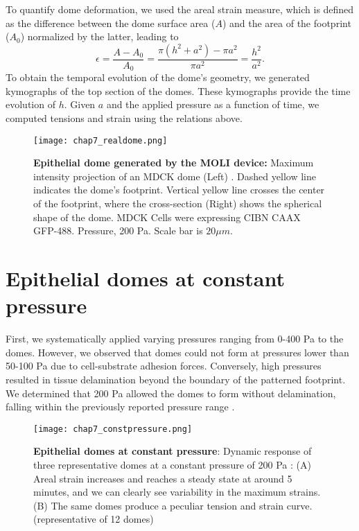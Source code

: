To quantify dome deformation, we used the areal strain measure, which is defined as the difference between the dome surface area ($A$) and the area of the footprint ($A_{0}$) normalized by the latter, leading to
\begin{equation}
	\label{eqn:arealstrain}
	\epsilon = \frac{A - A_{0}}{A_{0}} = \frac{\pi(h^2 + a^2) - \pi a^2}{\pi a^2} = \frac{h^2}{a^2} .
\end{equation}
To obtain the temporal evolution of the dome’s geometry, we generated kymographs of the top section of the domes. These kymographs provide the time evolution of $h$. Given $a$ and the applied pressure as a function of time, we computed tensions and strain using the relations above.

\begin{figure}
	\centering
	\texttt{[image: chap7\_realdome.png]}
	\caption{\textbf{Epithelial dome generated by the MOLI device:} Maximum intensity projection of an MDCK dome (Left) . Dashed yellow line indicates the dome's footprint. Vertical yellow line crosses the center of the footprint, where the cross-section   (Right) shows the spherical shape of the dome. MDCK Cells were expressing CIBN CAAX GFP-488. Pressure, 200 Pa. Scale bar is $20 \mu m$.
	} \label{fig_7_1}
\end{figure}

\hypertarget{epithelial-domes-at-constant-pressure}{%
	\section{Epithelial domes at constant
		pressure}\label{epithelial-domes-at-constant-pressure}}

First, we systematically applied varying pressures ranging from 0-400 \unit{\pascal} to the domes. However, we observed that domes could not form at pressures lower than 50-100 \unit{\pascal} due to cell-substrate adhesion forces. Conversely, high pressures resulted in tissue delamination beyond the boundary of the patterned footprint. We determined that 200 \unit{\pascal} allowed the domes to form without delamination, falling within the previously reported pressure range \cite{choudhury2022,marin-llaurado2022}.

\begin{figure}[b!]
	\centering
	\texttt{[image: chap7\_constpressure.png]}
	\caption{\label{fig_7_3} \textbf{Epithelial domes at constant pressure}: Dynamic response of three representative domes at a constant pressure of 200 Pa : (A) Areal strain increases and reaches a steady state at around 5 minutes, and we can clearly see variability in the maximum strains. (B) The same domes produce a peculiar tension and strain curve. (representative of 12 domes)
	}
\end{figure}


